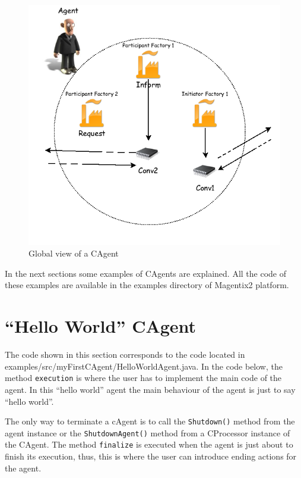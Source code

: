 \begin{figure}
\centering
\includegraphics[scale=0.37]{ProgrammingAgents/images/global}
\caption{Global view of a CAgent}
\label{img:global}
\end{figure}

In the next sections some examples of CAgents are explained. All the code of these examples are available in the examples directory of Magentix2 platform.

\section{``Hello World'' CAgent}
The code shown in this section corresponds to the code located in examples/src/myFirstCAgent/HelloWorldAgent.java. In the code below, the method \texttt{execution} is where the user has to implement the main code of the agent. In this ``hello world'' agent the main behaviour of the agent is just to say ``hello world''.

The only way to terminate a cAgent is to call the \texttt{Shutdown()} method from the agent instance or the \texttt{ShutdownAgent()} method from a CProcessor instance of the CAgent. The method \texttt{finalize} is executed when the agent is just about to finish its execution, thus, this is where the user can introduce ending actions for the agent.

